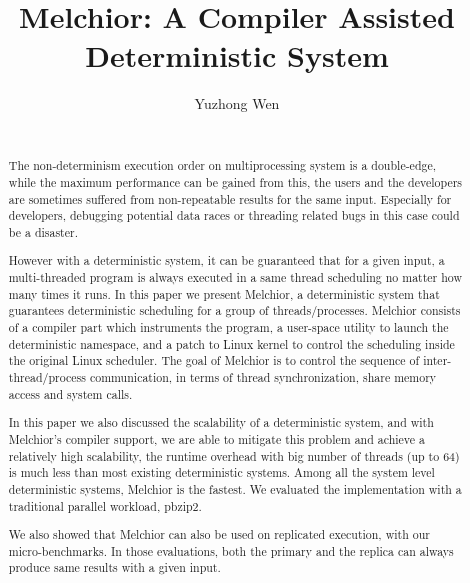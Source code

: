 \documentclass{sig-alternate}
\begin{document}
\title{Melchior: A Compiler Assisted Deterministic System}

\author{
\alignauthor
Yuzhong Wen\titlenote{}\\
       \\
}


\maketitle
\begin{abstract}
The non-determinism execution order on multiprocessing system is a double-edge, while the maximum performance can be gained from this, the users and the developers are sometimes suffered from non-repeatable results for the same input. Especially for developers, debugging potential data races or threading related bugs in this case could be a disaster.

However with a deterministic system, it can be guaranteed that for a given input, a multi-threaded program is always executed in a same thread scheduling no matter how many times it runs. In this paper we present Melchior, a deterministic system that guarantees deterministic scheduling for a group of threads/processes. Melchior consists of a compiler part which instruments the program, a user-space utility to launch the deterministic namespace, and a patch to Linux kernel to control the scheduling inside the original Linux scheduler. The goal of Melchior is to control the sequence of inter-thread/process communication, in terms of thread synchronization, share memory access and system calls.

In this paper we also discussed the scalability of a deterministic system, and with Melchior's compiler support, we are able to mitigate this problem and achieve a relatively high scalability, the runtime overhead with big number of threads (up to 64) is much less than most existing deterministic systems. Among all the system level deterministic systems, Melchior is the fastest. We evaluated the implementation with a traditional parallel workload, pbzip2.

We also showed that Melchior can also be used on replicated execution, with our micro-benchmarks. In those evaluations, both the primary and the replica can always produce same results with a given input.

\end{abstract}
\end{document}
